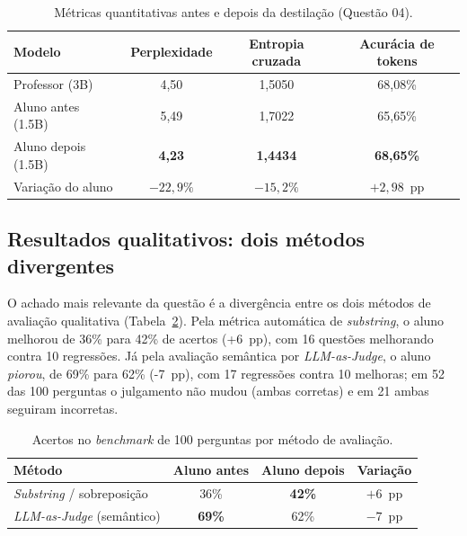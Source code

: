 \begin{table}[ht]
  \centering
  \caption{Métricas quantitativas antes e depois da destilação (Questão 04).}
  \label{tab:q4-quant}
  \footnotesize
  \begin{tabular}{@{}l c c c@{}}
    \toprule
    \textbf{Modelo} & \textbf{Perplexidade} & \textbf{Entropia cruzada} & \textbf{Acurácia de tokens} \\
    \midrule
    Professor (3B)        & 4,50 & 1,5050 & 68,08\% \\
    Aluno antes (1.5B)    & 5,49 & 1,7022 & 65,65\% \\
    Aluno depois (1.5B)   & \textbf{4,23} & \textbf{1,4434} & \textbf{68,65\%} \\
    \midrule
    Variação do aluno     & $-22{,}9\%$ & $-15{,}2\%$ & $+2{,}98$~pp \\
    \bottomrule
  \end{tabular}
\end{table}

\subsection{Resultados qualitativos: dois métodos divergentes}

O achado mais relevante da questão é a divergência entre os dois métodos de avaliação
qualitativa (Tabela~\ref{tab:q4-qual}). Pela métrica automática de \textit{substring},
o aluno melhorou de 36\% para 42\% de acertos (+6~pp), com 16 questões melhorando
contra 10 regressões. Já pela avaliação semântica por \textit{LLM-as-Judge}, o aluno
\emph{piorou}, de 69\% para 62\% (-7~pp), com 17 regressões contra 10 melhoras; em 52
das 100 perguntas o julgamento não mudou (ambas corretas) e em 21 ambas seguiram
incorretas.

\begin{table}[ht]
  \centering
  \caption{Acertos no \textit{benchmark} de 100 perguntas por método de avaliação.}
  \label{tab:q4-qual}
  \footnotesize
  \begin{tabular}{@{}l c c c@{}}
    \toprule
    \textbf{Método} & \textbf{Aluno antes} & \textbf{Aluno depois} & \textbf{Variação} \\
    \midrule
    \textit{Substring} / sobreposição & 36\% & \textbf{42\%} & $+6$~pp \\
    \textit{LLM-as-Judge} (semântico)  & \textbf{69\%} & 62\% & $-7$~pp \\
    \bottomrule
  \end{tabular}
\end{table}

